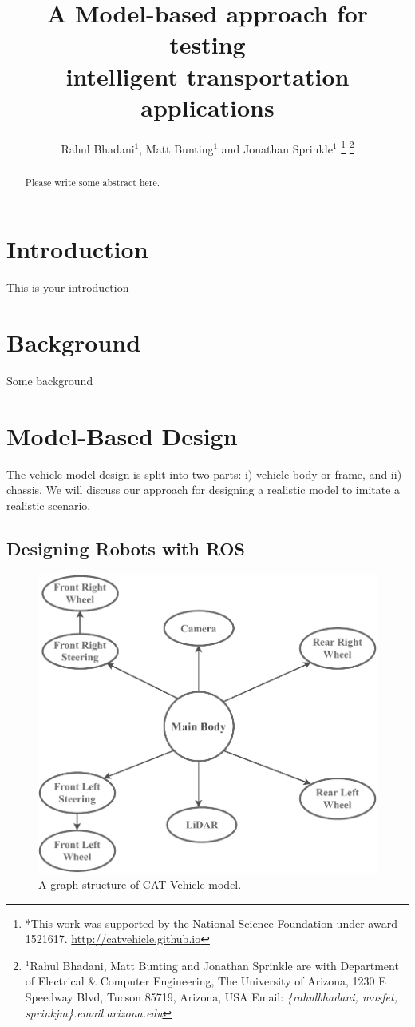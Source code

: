 \documentclass[letterpaper, 10 pt, conference]{ieeeconf}  %
\title{\LARGE \bf
A Model-based approach for testing\\intelligent transportation applications
}
\author{Rahul Bhadani$^{1}$, Matt Bunting$^{1}$ and Jonathan Sprinkle$^{1}$%
\thanks{*This work was supported by the National Science Foundation under award 1521617. \url{http://catvehicle.github.io}}%
\thanks{$^{1}$Rahul Bhadani, Matt Bunting and Jonathan Sprinkle are  with Department of Electrical \& Computer Engineering,
       The University of Arizona, 1230 E Speedway Blvd, Tucson 85719, Arizona, USA
        {Email: \sl\footnotesize \{rahulbhadani, mosfet, sprinkjm\}.email.arizona.edu}}%
}
\begin{document}
\maketitle
\thispagestyle{empty}
\pagestyle{empty}



\begin{abstract}
Please write some abstract here.

\end{abstract}


\section{Introduction}
\label{sec:intro}
This is your introduction

\section{Background}
\label{sec:background}
Some background

\section{Model-Based Design}
\label{sec:mbd}
The vehicle model design is split into two parts: i) vehicle body or frame, and ii) chassis. We will discuss our approach for designing a realistic model to imitate a realistic scenario.

\subsection{Designing Robots with ROS}


 \begin{figure}[htbp]
    \centering
    \includegraphics[angle=0,origin=c,trim={0.0cm 0.0cm 0.0cm 0.0cm},clip,width=1.0\linewidth]{urdfstruct.pdf}
    \caption{A graph structure of CAT Vehicle model.}
    \label{fig:urdfstruct}
    \end{figure}
    
\end{document}
